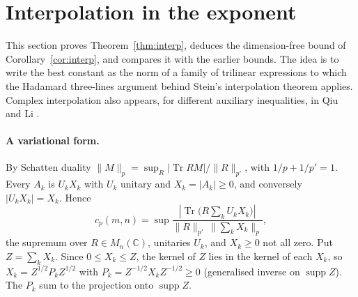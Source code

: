 \documentclass[11pt,a4paper]{article}
\numberwithin{equation}{section}
\theoremstyle{definition}
\theoremstyle{remark}
\DeclareMathOperator{\Tr}{Tr}
\DeclareMathOperator{\supp}{supp}
\newcommand{\C}{\mathbb C}
\newcommand{\abs}[1]{\left\lvert #1\right\rvert}
\begin{document}
\section{Interpolation in the exponent}\label{sec:interp}

This section proves Theorem~\ref{thm:interp}, deduces the
dimension-free bound of Corollary~\ref{cor:interp}, and compares it with
the earlier bounds. The idea is to write the best constant as the norm of
a family of trilinear expressions to which the Hadamard three-lines
argument behind Stein's interpolation theorem \cite{Stein} applies. Complex interpolation also appears, for different auxiliary
inequalities, in Qiu \cite[Section 3]{Qiu} and Li \cite[Lemma 2.5]{Li}.

\paragraph{A variational form.}
By Schatten duality \(\|M\|_p=\sup_R\abs{\Tr RM}/\|R\|_{p'}\), with
\(1/p+1/p'=1\). Every \(A_k\) is \(U_kX_k\) with \(U_k\) unitary and
\(X_k=|A_k|\ge0\), and conversely \(|U_kX_k|=X_k\). Hence
\begin{equation}\label{eq:variational}
 c_p(m,n)=\sup\frac{\abs{\Tr\bigl(R\sum_kU_kX_k\bigr)}}
                   {\|R\|_{p'}\,\|\sum_kX_k\|_p},
\end{equation}
the supremum over \(R\in M_n(\C)\), unitaries \(U_k\), and \(X_k\ge0\)
not all zero. Put \(Z=\sum_kX_k\). Since \(0\le X_k\le Z\), the kernel of
\(Z\) lies in the kernel of each \(X_k\), so
\(X_k=Z^{1/2}P_kZ^{1/2}\) with \(P_k=Z^{-1/2}X_kZ^{-1/2}\ge0\)
(generalised inverse on \(\supp Z\)). The \(P_k\) sum to the projection onto
\(\supp Z\).
\end{document}
